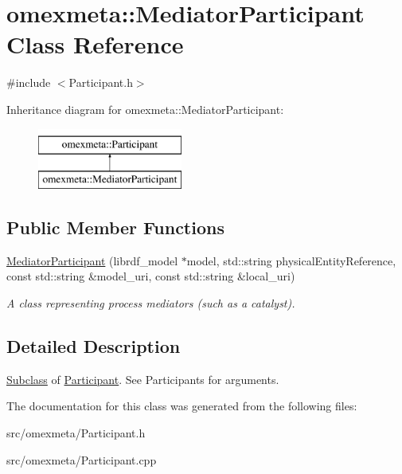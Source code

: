 \hypertarget{classomexmeta_1_1MediatorParticipant}{}\section{omexmeta\+:\+:Mediator\+Participant Class Reference}
\label{classomexmeta_1_1MediatorParticipant}


{\ttfamily \#include $<$Participant.\+h$>$}

Inheritance diagram for omexmeta\+:\+:Mediator\+Participant\+:\begin{figure}[H]
\begin{center}
\leavevmode
\includegraphics[height=2.000000cm]{classomexmeta_1_1MediatorParticipant}
\end{center}
\end{figure}
\subsection*{Public Member Functions}
\begin{DoxyCompactItemize}
\item 
\mbox{\label{classomexmeta_1_1MediatorParticipant_a82d3e1fe6f987e1bf2ba838b75c9c3f0}} 
\hyperlink{classomexmeta_1_1MediatorParticipant_a82d3e1fe6f987e1bf2ba838b75c9c3f0}{Mediator\+Participant} (librdf\+\_\+model $\ast$model, std\+::string physical\+Entity\+Reference, const std\+::string \&model\+\_\+uri, const std\+::string \&local\+\_\+uri)
\begin{DoxyCompactList}\small\item\em A class representing process mediators (such as a catalyst). \end{DoxyCompactList}\end{DoxyCompactItemize}


\subsection{Detailed Description}
\hyperlink{classSubclass}{Subclass} of \hyperlink{classomexmeta_1_1Participant}{Participant}. See Participants for arguments. 

The documentation for this class was generated from the following files\+:\begin{DoxyCompactItemize}
\item 
src/omexmeta/Participant.\+h\item 
src/omexmeta/Participant.\+cpp\end{DoxyCompactItemize}
